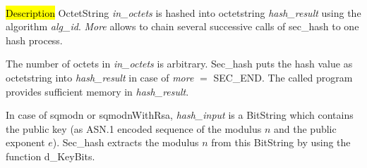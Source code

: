 
      
 \\ [0.5cm]

\hl{Description}
OctetString {\em in\_octets} is hashed into octetstring {\em hash\_result} using the algorithm
{\em alg\_id}. {\em More} allows to chain several successive calls of sec\_hash to one
hash process. 

The number of octets in {\em in\_octets} is arbitrary. Sec\_hash puts the hash value as octetstring into
{\em hash\_result} in case of {\em more} $=$ SEC\_END. The called program provides sufficient memory
in {\em hash\_result}. 

In case of sqmodn or sqmodnWithRsa, {\em hash\_input} is a BitString which contains the 
public key (as ASN.1 encoded sequence of the modulus $n$ and the public
exponent $e$). Sec\_hash extracts the modulus $n$ from this BitString by using the function
d\_KeyBits.

